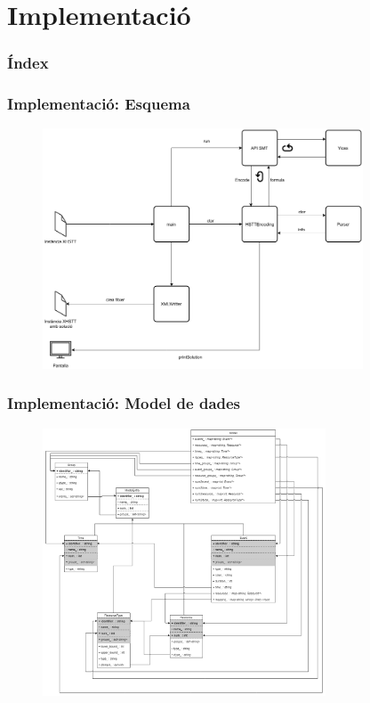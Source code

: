 \documentclass[13pt]{beamer}
\begin{document}
  \section{Implementació}
  \begin{frame}
    \frametitle{Índex}
    \tableofcontents[currentsection]
  \end{frame}
  
  \begin{frame}
  \frametitle{Implementació: Esquema}
    \begin{figure}[p]
      \includegraphics[width=0.85\textwidth]{Diagrames/Arqui2.png}
      \label{fig:procs}
    \end{figure}
  \end{frame}

  \begin{frame}
    \frametitle{Implementació: Model de dades}
    \begin{figure}[p]
      \includegraphics[width=0.75\textwidth]{Diagrames/ModelDades.png}
      \label{fig:procs}
    \end{figure}
  \end{frame}
\end{document}
